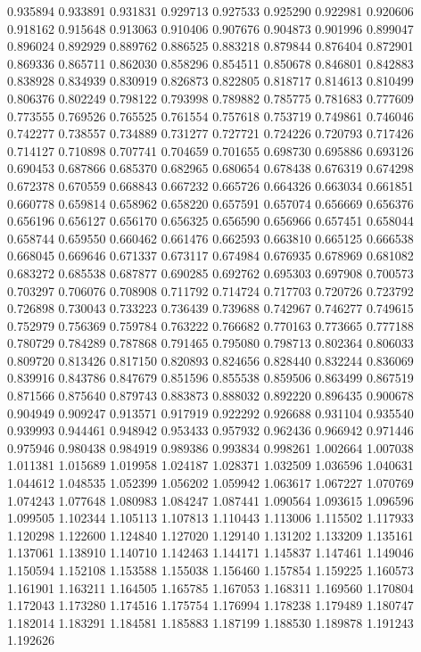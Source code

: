 0.935894
0.933891
0.931831
0.929713
0.927533
0.925290
0.922981
0.920606
0.918162
0.915648
0.913063
0.910406
0.907676
0.904873
0.901996
0.899047
0.896024
0.892929
0.889762
0.886525
0.883218
0.879844
0.876404
0.872901
0.869336
0.865711
0.862030
0.858296
0.854511
0.850678
0.846801
0.842883
0.838928
0.834939
0.830919
0.826873
0.822805
0.818717
0.814613
0.810499
0.806376
0.802249
0.798122
0.793998
0.789882
0.785775
0.781683
0.777609
0.773555
0.769526
0.765525
0.761554
0.757618
0.753719
0.749861
0.746046
0.742277
0.738557
0.734889
0.731277
0.727721
0.724226
0.720793
0.717426
0.714127
0.710898
0.707741
0.704659
0.701655
0.698730
0.695886
0.693126
0.690453
0.687866
0.685370
0.682965
0.680654
0.678438
0.676319
0.674298
0.672378
0.670559
0.668843
0.667232
0.665726
0.664326
0.663034
0.661851
0.660778
0.659814
0.658962
0.658220
0.657591
0.657074
0.656669
0.656376
0.656196
0.656127
0.656170
0.656325
0.656590
0.656966
0.657451
0.658044
0.658744
0.659550
0.660462
0.661476
0.662593
0.663810
0.665125
0.666538
0.668045
0.669646
0.671337
0.673117
0.674984
0.676935
0.678969
0.681082
0.683272
0.685538
0.687877
0.690285
0.692762
0.695303
0.697908
0.700573
0.703297
0.706076
0.708908
0.711792
0.714724
0.717703
0.720726
0.723792
0.726898
0.730043
0.733223
0.736439
0.739688
0.742967
0.746277
0.749615
0.752979
0.756369
0.759784
0.763222
0.766682
0.770163
0.773665
0.777188
0.780729
0.784289
0.787868
0.791465
0.795080
0.798713
0.802364
0.806033
0.809720
0.813426
0.817150
0.820893
0.824656
0.828440
0.832244
0.836069
0.839916
0.843786
0.847679
0.851596
0.855538
0.859506
0.863499
0.867519
0.871566
0.875640
0.879743
0.883873
0.888032
0.892220
0.896435
0.900678
0.904949
0.909247
0.913571
0.917919
0.922292
0.926688
0.931104
0.935540
0.939993
0.944461
0.948942
0.953433
0.957932
0.962436
0.966942
0.971446
0.975946
0.980438
0.984919
0.989386
0.993834
0.998261
1.002664
1.007038
1.011381
1.015689
1.019958
1.024187
1.028371
1.032509
1.036596
1.040631
1.044612
1.048535
1.052399
1.056202
1.059942
1.063617
1.067227
1.070769
1.074243
1.077648
1.080983
1.084247
1.087441
1.090564
1.093615
1.096596
1.099505
1.102344
1.105113
1.107813
1.110443
1.113006
1.115502
1.117933
1.120298
1.122600
1.124840
1.127020
1.129140
1.131202
1.133209
1.135161
1.137061
1.138910
1.140710
1.142463
1.144171
1.145837
1.147461
1.149046
1.150594
1.152108
1.153588
1.155038
1.156460
1.157854
1.159225
1.160573
1.161901
1.163211
1.164505
1.165785
1.167053
1.168311
1.169560
1.170804
1.172043
1.173280
1.174516
1.175754
1.176994
1.178238
1.179489
1.180747
1.182014
1.183291
1.184581
1.185883
1.187199
1.188530
1.189878
1.191243
1.192626
